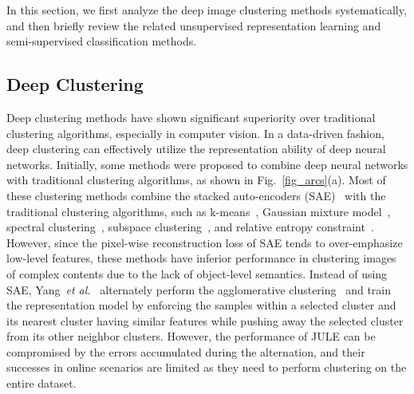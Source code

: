 \documentclass[journal]{IEEEtran}
\newcommand{\etal}{\emph{et al.}\xspace}
\begin{document}
In this section, we first analyze the deep image clustering methods systematically, and then briefly review the related unsupervised representation learning and semi-supervised classification methods.

\subsection{Deep Clustering}
\label{sec_udc}
Deep clustering methods have shown significant superiority over traditional clustering algorithms, especially in computer vision.
In a data-driven fashion, deep clustering can effectively utilize the representation ability of deep neural networks.
Initially, some methods were proposed to combine deep neural networks with traditional clustering algorithms, as shown in Fig.~\ref{fig_arcs}(a).
Most of these clustering methods combine the stacked auto-encoders (SAE)~\cite{SDAE2010} with the traditional clustering algorithms, such as k-means~\cite{DEN2014, Xie2016, DCN2016, DMC2017, LI2018161}, Gaussian mixture model~\cite{DeepCluster2017, VaDE2017, GMVAE}, spectral clustering~\cite{DSCN2017}, subspace clustering~\cite{DASC2018, Zhang_2019_CVPR}, and relative entropy constraint~\cite{DEPICT2017}. However, since the pixel-wise reconstruction loss of SAE tends to over-emphasize low-level features, these methods have inferior performance in clustering images of complex contents due to the lack of object-level semantics.
Instead of using SAE, Yang~\etal~\cite{Yang2016Joint} alternately perform the agglomerative clustering~\cite{Agglomerative} and train the representation model by enforcing the samples within a selected cluster and its nearest cluster having similar features while pushing away the selected cluster from its other neighbor clusters. However, the performance of JULE can be compromised by the errors accumulated during the alternation, and their successes in online scenarios are limited as they need to perform clustering on the entire dataset.
\end{document}
